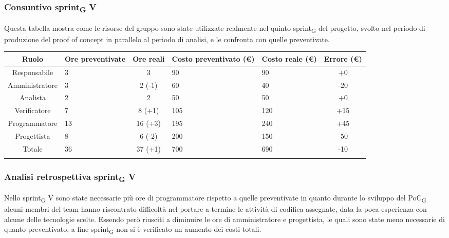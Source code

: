 
\newpage
\subsubsection{Consuntivo sprint\textsubscript{G} V}
Questa tabella mostra come le risorse del gruppo sono state utilizzate realmente nel quinto sprint\textsubscript{G} del progetto, svolto nel periodo di produzione del proof of concept in parallelo al periodo di analisi, e le confronta con quelle preventivate.

\setlength\extrarowheight{5pt}
\begin{tabularx}{\textwidth}{|c|XcXX|c|}
	\hline
	\rowcolor{white}
	\textbf{Ruolo} & \textbf{Ore preventivate} & \textbf{Ore reali} & \textbf{Costo preventivato (€)} & \textbf{Costo reale (€)} & \textbf{Errore (€)} \\
	\hline
	Responsabile &3&3&90&90&+0\\
	Amministratore &3&2 (-1)&60&40&-20\\
	Analista &2&2&50&50&+0\\
	Verificatore &7&8 (+1)&105&120&+15\\
	Programmatore &13&16 (+3)&195&240&+45\\
	Progettista &8&6 (-2)&200&150&-50 \\
	\hline
	Totale &36&37 (+1)&700&690&-10\\
	\hline
	\rowcolor{white}
	\caption{Consuntivo ore e costi per ruolo del quinto sprint\textsubscript{G}}
\end{tabularx}
\subsubsection{Analisi retrospettiva sprint\textsubscript{G} V}
Nello sprint\textsubscript{G} V sono state necessarie più ore di programmatore rispetto a quelle preventivate in quanto durante lo sviluppo del PoC\textsubscript{G} alcuni membri del team hanno riscontrato difficoltà nel portare a termine le attività di codifica assegnate, data la poca esperienza con alcune delle tecnologie scelte. Essendo però riusciti a diminuire le ore di amministratore e progettista, le quali sono state meno necessarie di quanto preventivato, a fine sprint\textsubscript{G} non si è verificato un aumento dei costi totali.
\newpage

